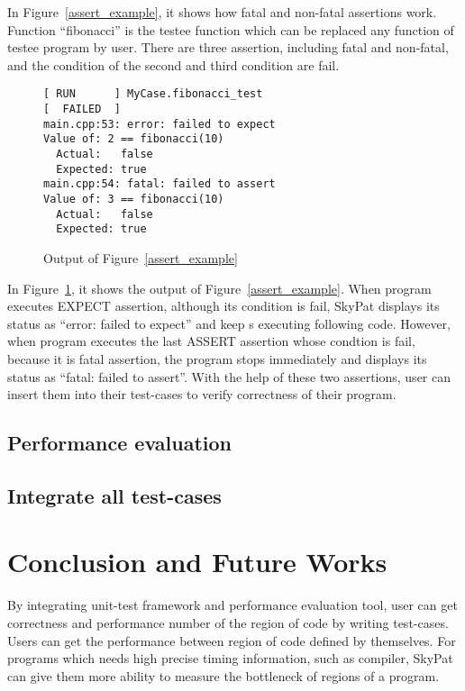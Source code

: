 \documentclass[final]{ols}
\begin{document}
In Figure~\ref{assert_example}, it shows how fatal and non-fatal assertions work.
Function ``fibonacci'' is the testee function which can be replaced any function of testee program by user.
There are three assertion, including fatal and non-fatal, and the condition of the second and third condition are fail.

\begin{figure}[h]
\lstset{language=sh}
\begin{lstlisting}[frame=single]
[ RUN      ] MyCase.fibonacci_test
[  FAILED  ] 
main.cpp:53: error: failed to expect
Value of: 2 == fibonacci(10)
  Actual:   false
  Expected: true
main.cpp:54: fatal: failed to assert
Value of: 3 == fibonacci(10)
  Actual:   false
  Expected: true
\end{lstlisting}
\caption{Output of Figure~\ref{assert_example}}
\label{assert_example_output}
\end{figure}

In Figure~\ref{assert_example_output}, it shows the output of Figure~\ref{assert_example}.
When program executes EXPECT assertion, although its condition is fail, SkyPat displays its status as ``error: failed to expect'' and keep s executing following code.
However, when program executes the last ASSERT assertion whose condtion is fail, because it is fatal assertion, the program stops immediately and displays its status as ``fatal: failed to assert''.
With the help of these two assertions, user can insert them into their test-cases to verify correctness of their program.

\subsection{Performance evaluation}

\subsection{Integrate all test-cases}



\section{Conclusion and Future Works}
By integrating unit-test framework and performance evaluation tool, user can get correctness and performance number of the region of code by writing test-cases.
Users can get the performance between region of code defined by themselves.
For programs which needs high precise timing information, such as compiler, SkyPat can give them more ability to measure the bottleneck of regions of a program.
\end{document}
